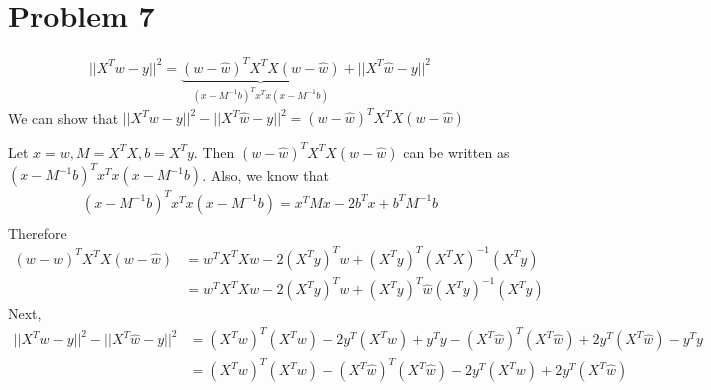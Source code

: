 \section{Problem 7}

	\begin{align*}
		||X^{T}w - y||^{2} = \underbrace{(w - \hat{w})^{T} X^{T}X (w - \hat{w})}_{(x - M^{-1}b)^{T} x^{T}x (x - M^{-1}b)} + ||X^{T}\hat{w} - y||^{2}
	\end{align*}
	We can show that $||X^{T}w - y||^{2} - ||X^{T}\hat{w} - y||^{2} = (w - \hat{w})^{T} X^{T}X (w - \hat{w})$ 
	\par
	Let $x = w, M = X^{T}X, b = X^{T}y$. Then $(w - \hat{w})^{T} X^{T}X (w - \hat{w})$ can be written as $(x - M^{-1}b)^{T} x^{T}x (x - M^{-1}b)$. Also, we know that \\
	\begin{align*}
		(x - M^{-1}b)^{T} x^{T}x (x - M^{-1}b) = x^{T}Mx - 2b^{T}x + b^{T}M^{-1}b \\		
	\end{align*}
	Therefore
	\begin{align*}
		(w - \hat{w})^{T} X^{T}X (w - \hat{w}) & = w^{T}X^{T}Xw - 2(X^{T}y)^{T}w + (X^{T}y)^{T}(X^{T}X)^{-1}(X^{T}y) \\
		& = w^{T}X^{T}Xw - 2(X^{T}y)^{T}w + (X^{T}y)^{T}\hat{w}(X^{T}y)^{-1}(X^{T}y)
	\end{align*}
	Next,
	\begin{align*}
		||X^{T}w - y||^{2}- ||X^{T}\hat{w} - y||^{2} & = (X^{T}w)^{T}(X^{T}w) - 2y^{T}(X^{T}w) + y^{T}y - (X^{T}\hat{w})^{T}(X^{T}\hat{w}) + 2y^{T}(X^{T}\hat{w}) - y^{T}y \\
		& = (X^{T}w)^{T}(X^{T}w) - (X^{T}\hat{w})^{T}(X^{T}\hat{w}) - 2y^{T}(X^{T}w) + 2y^{T}(X^{T}\hat{w})
	\end{align*}
